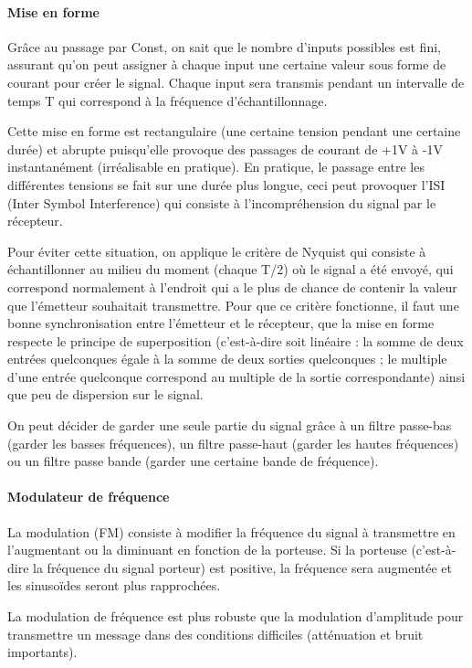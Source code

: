 \paragraph{Mise en forme} Grâce au passage par Const, on sait que le nombre d'inputs possibles est fini, assurant qu'on peut assigner à chaque input une certaine valeur sous forme de courant pour créer le signal. Chaque input sera transmis pendant un intervalle de temps T qui correspond à la fréquence d'échantillonnage.

Cette mise en forme est rectangulaire (une certaine tension pendant une certaine durée) et \og{}abrupte\fg{} puisqu'elle provoque des passages de courant de +1V à -1V instantanément (irréalisable en pratique). En pratique, le passage entre les différentes tensions se fait sur une durée plus longue, ceci peut provoquer l'ISI (Inter Symbol Interference) qui consiste à l'incompréhension du signal par le récepteur.

Pour éviter cette situation, on applique le critère de Nyquist qui consiste à échantillonner au milieu du moment (chaque T/2) où le signal a été envoyé, qui correspond normalement à l'endroit qui a le plus de chance de contenir la valeur que l'émetteur souhaitait transmettre. Pour que ce critère fonctionne, il faut une bonne synchronisation entre l'émetteur et le récepteur, que la mise en forme respecte le principe de superposition (c'est-à-dire soit linéaire : la somme de deux entrées quelconques égale à la somme de deux sorties quelconques ; le multiple d'une entrée quelconque correspond au multiple de la sortie correspondante) ainsi que peu de dispersion sur le signal.

On peut décider de garder une seule partie du signal grâce à un filtre passe-bas (garder les basses fréquences), un filtre passe-haut (garder les hautes fréquences) ou un filtre passe bande (garder une certaine bande de fréquence).

\paragraph{Modulateur de fréquence}

La modulation (FM) consiste à modifier la fréquence du signal à transmettre en l'augmentant ou la diminuant en fonction de la porteuse.  Si la porteuse (c'est-à-dire la fréquence du signal porteur) est positive, la fréquence sera augmentée et les sinusoïdes seront plus rapprochées.

La modulation de fréquence est plus robuste que la modulation d'amplitude pour transmettre un message dans des conditions difficiles (atténuation et bruit importants).  

